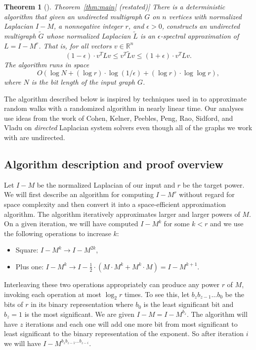 \documentclass[11pt]{article}
\numberwithin{equation}{section}
\theoremstyle{definition}
\theoremstyle{plain}
\newcommand{\expref}[2]{\hyperref[#2]{#1~\ref{#2}}}
\newcommand{\wt}{\widetilde}   %
\newcommand{\SC}{O(\log N + (\log r)\cdot\log(1/\epsilon)+(\log r)\cdot \log\log r)}
\numberwithin{myalgctr}{section}
\theoremstyle{named}
\newtheorem{namedtheorem}{Theorem}[section]
\begin{document}
\begin{namedtheorem}[\expref{Theorem}{thm:main} (restated)]
There is a deterministic algorithm that given an undirected multigraph $G$ on $n$ vertices with normalized Laplacian $I-M$, a nonnegative integer $r$, and $\epsilon>0$, constructs an undirected multigraph $\wt{G}$ whose normalized Laplacian $\wt{L}$ is an $\epsilon$-spectral approximation of $L=I-M^r$. That is, for all vectors $v\in\mathbb{R}^n$
\[
(1-\epsilon)\cdot v^{T}Lv \leq v^{T}\wt{L}v \leq (1+\epsilon)\cdot v^{T}Lv.
\]
The algorithm runs in space
\[
  \SC,
\]
where $N$ is the bit length of the input graph $G$.
\end{namedtheorem}

The algorithm described below is inspired by techniques used in \cite{cheng2015} to approximate random walks with a randomized algorithm in nearly linear time. Our analyses use ideas from the work of Cohen, Kelner, Peebles, Peng, Rao, Sidford, and Vladu on \emph{directed} Laplacian system solvers even though all of the graphs we work with are undirected.
%
\subsection{Algorithm description and proof overview}
\label{sect:description}
Let $I-M$ be the normalized Laplacian of our input and $r$ be the target power. We will first describe an algorithm for computing $I-M^r$ without regard for space complexity and then convert it into a space-efficient approximation algorithm. The algorithm iteratively approximates larger and larger powers of $M$. On a given iteration, we will have computed $I-M^k$ for some $k<r$ and we use the following operations to increase $k$:
\begin{itemize}
\item Square: $I-M^k \rightarrow I-M^{2k}$,
\item Plus one: $I-M^{k} \rightarrow I-\frac{1}{2}\cdot (M\cdot M^{k}+ M^{k}\cdot M) = I-M^{k+1}$.
\end{itemize}

Interleaving these two operations appropriately can produce any power $r$ of $M$, invoking each operation at most $\log_2 r$ times. To see this, let $b_zb_{z-1}\ldots b_0$ be the bits of $r$ in its binary representation where $b_0$ is the least significant bit and $b_{z}=1$ is the most significant. We are given $I-M=I-M^{b_z}$. The algorithm will have $z$ iterations and each one will add one more bit from most significant to least significant to the binary representation of the exponent. So after iteration $i$ we will have $I-M^{b_zb_{z-1}\ldots b_{z-i}}$.
\end{document}
